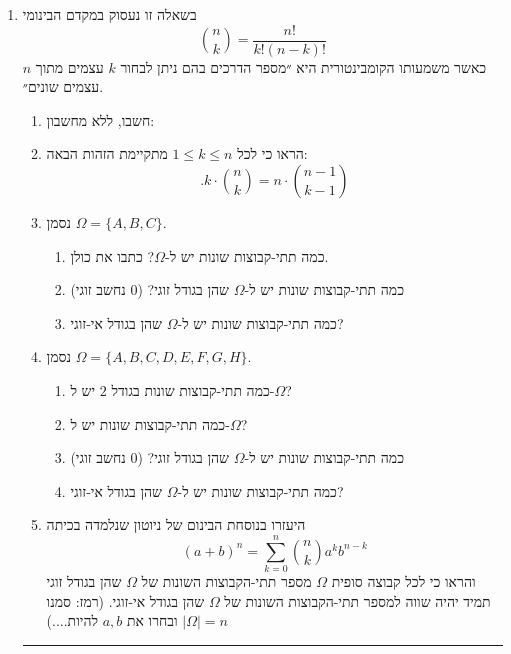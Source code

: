 \documentclass[12pt, a4paper]{article}
\begin{document}
\begin{enumerate}
\item
 בשאלה זו נעסוק במקדם הבינומי
 $$\binom{n}{k}=\frac{n!}{k!(n-k)!}$$
 כאשר משמעותו הקומבינטורית היא ״מספר הדרכים בהם ניתן לבחור
 $k$
 עצמים מתוך
 $n$
 עצמים שונים״.
\begin{enumerate}
\item
חשבו, ללא מחשבון:
\begin{enumerate}
\end{enumerate}
\item
הראו כי
לכל
$1\le k\le n$
 מתקיימת הזהות הבאה:
$$.k\cdot \binom{n}{k}
=n\cdot \binom{n-1}{k-1}$$
\item
נסמן
$\Omega=\{A,B,C\}$.
\begin{enumerate}
\item[(1)]
כמה תתי-קבוצות שונות 
יש ל-$\Omega$?
כתבו את כולן.
\item[(2)]
כמה תתי-קבוצות שונות יש ל-$\Omega$
שהן בגודל זוגי? ($0$
נחשב זוגי)
\item[(3)]
כמה תתי-קבוצות שונות יש ל-$\Omega$
שהן בגודל אי-זוגי? \\
\end{enumerate}

\item
נסמן
$\Omega=\{A,B,C,D,E,F,G,H\}$.
\begin{enumerate}
\item[(1)]
כמה תתי-קבוצות שונות בגודל
$2$
יש ל-$\Omega$?
\item[(2)]
כמה תתי-קבוצות שונות יש ל-$\Omega$?
\item[(3)]
כמה תתי-קבוצות שונות יש ל-$\Omega$
שהן בגודל זוגי? ($0$
נחשב זוגי)
\item[(4)]
כמה תתי-קבוצות שונות יש ל-$\Omega$
שהן בגודל אי-זוגי?\\ 
\end{enumerate}
\item
היעזרו בנוסחת הבינום של ניוטון שנלמדה בכיתה
$$(a+b)^n=
\sum_{k=0}^{n}
\binom{n}{k}a^kb^{n-k}$$
והראו כי לכל קבוצה סופית
$\Omega$
מספר תתי-הקבוצות השונות
של
$\Omega$
שהן בגודל זוגי תמיד יהיה שווה למספר תתי-הקבוצות השונות 
של
$\Omega$
שהן בגודל אי-זוגי.
(רמז: סמנו
$|\Omega|=n$
ובחרו את
$a,b$ 
להיות....)
\end{enumerate}

\noindent\rule{15cm}{0.4pt}


\end{enumerate}
\end{document}
